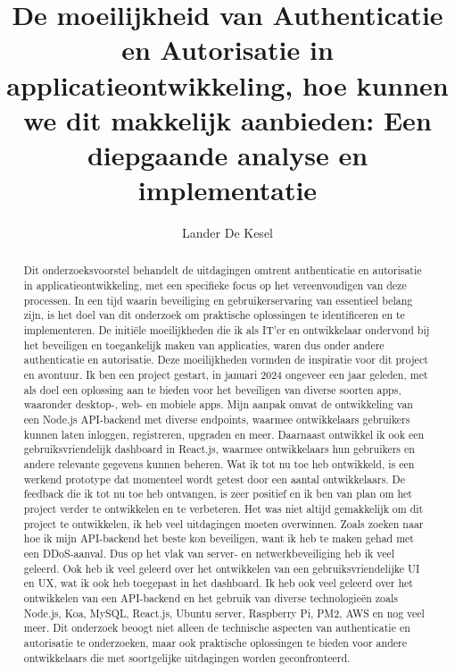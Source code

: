 \documentclass{hogent-article}
\title{De moeilijkheid van Authenticatie en Autorisatie in applicatieontwikkeling, hoe kunnen we dit makkelijk aanbieden: Een diepgaande analyse en implementatie}
\author{Lander De Kesel}
\begin{document}
\begin{abstract}
  Dit onderzoeksvoorstel behandelt de uitdagingen omtrent authenticatie en autorisatie in applicatieontwikkeling, met een specifieke focus op het 
  vereenvoudigen van deze processen. In een tijd waarin beveiliging en gebruikerservaring van essentieel belang zijn, is het doel van dit 
  onderzoek om praktische oplossingen te identificeren en te implementeren.
  \newline
  \newline
  De initiële moeilijkheden die ik als IT'er en ontwikkelaar ondervond bij het beveiligen en toegankelijk maken van applicaties, waren dus onder andere
  authenticatie en autorisatie. Deze moeilijkheden vormden de inspiratie voor dit project en avontuur.
  \newline
  \newline
  Ik ben een project gestart, in januari 2024 ongeveer een jaar geleden, met als doel een oplossing aan te bieden voor het beveiligen van diverse 
  soorten apps, waaronder desktop-, web- en mobiele apps. Mijn aanpak omvat de ontwikkeling van een Node.js API-backend met diverse endpoints, 
  waarmee ontwikkelaars gebruikers kunnen laten inloggen, registreren, upgraden en meer. Daarnaast ontwikkel ik ook een gebruiksvriendelijk dashboard 
  in React.js, waarmee ontwikkelaars hun gebruikers en andere relevante gegevens kunnen beheren. Wat ik tot nu toe heb ontwikkeld, is een werkend 
  prototype dat momenteel wordt getest door een aantal ontwikkelaars. De feedback die ik tot nu toe heb ontvangen, is zeer positief en ik ben van 
  plan om het project verder te ontwikkelen en te verbeteren. Het was niet altijd gemakkelijk om dit project te ontwikkelen, ik heb veel uitdagingen 
  moeten overwinnen. Zoals zoeken naar hoe ik mijn API-backend het beste kon beveiligen, want ik heb te maken gehad met een DDoS-aanval. Dus op het 
  vlak van server- en netwerkbeveiliging heb ik veel geleerd. Ook heb ik veel geleerd over het ontwikkelen van een gebruiksvriendelijke UI en UX, 
  wat ik ook heb toegepast in het dashboard. Ik heb ook veel geleerd over het ontwikkelen van een API-backend en het gebruik van diverse technologieën 
  zoals Node.js, Koa, MySQL, React.js, Ubuntu server, Raspberry Pi, PM2, AWS en nog veel meer.
  \newline
  \newline
  Dit onderzoek beoogt niet alleen de technische aspecten van authenticatie en autorisatie te onderzoeken, maar ook praktische oplossingen te bieden voor 
  andere ontwikkelaars die met soortgelijke uitdagingen worden geconfronteerd.
\end{abstract}

\tableofcontents



\printbibliography[heading=bibintoc]
\end{document}
